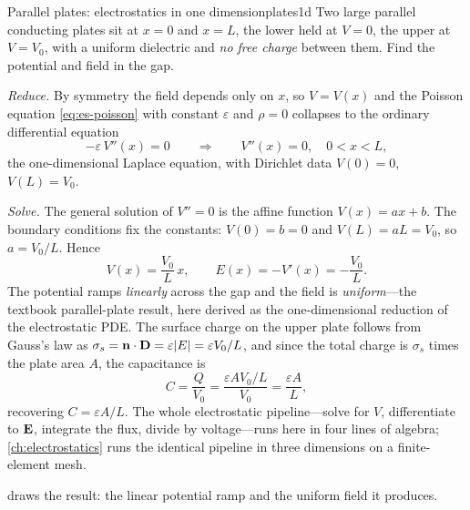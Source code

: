 \begin{workedexample}{Parallel plates: electrostatics in one dimension}{plates1d}
Two large parallel conducting plates sit at $x=0$ and $x=L$, the lower held at
$V=0$, the upper at $V=V_0$, with a uniform dielectric and \emph{no free charge}
between them. Find the potential and field in the gap.

\medskip
\emph{Reduce.} By symmetry the field depends only on $x$, so $V=V(x)$ and the
Poisson equation \cref{eq:es-poisson} with constant $\varepsilon$ and $\rho=0$
collapses to the ordinary differential equation
\begin{equation*}
  -\varepsilon\,V''(x) = 0
  \qquad\Longrightarrow\qquad
  V''(x) = 0,\quad 0<x<L,
\end{equation*}
the one-dimensional Laplace equation, with Dirichlet data $V(0)=0$, $V(L)=V_0$.

\emph{Solve.} The general solution of $V''=0$ is the affine function
$V(x)=ax+b$. The boundary conditions fix the constants: $V(0)=b=0$ and
$V(L)=aL=V_0$, so $a=V_0/L$. Hence
\begin{equation*}
  V(x) = \frac{V_0}{L}\,x,
  \qquad
  E(x) = -V'(x) = -\frac{V_0}{L}.
\end{equation*}
The potential ramps \emph{linearly} across the gap and the field is
\emph{uniform}---the textbook parallel-plate result, here derived as the
one-dimensional reduction of the electrostatic PDE. The surface charge on the
upper plate follows from Gauss's law as
$\sigma_s = \mathbf{n}\cdot\mathbf{D} = \varepsilon|E| = \varepsilon V_0/L$, and since the
total charge is $\sigma_s$ times the plate area $A$, the capacitance is
\begin{equation*}
  C = \frac{Q}{V_0} = \frac{\varepsilon A V_0/L}{V_0}
    = \frac{\varepsilon A}{L},
\end{equation*}
recovering $C=\varepsilon A/L$. The whole electrostatic pipeline---solve for $V$,
differentiate to $\mathbf{E}$, integrate the flux, divide by voltage---runs here in four
lines of algebra; \cref{ch:electrostatics} runs the identical pipeline in three
dimensions on a finite-element mesh.
\end{workedexample}

 draws the result: the linear potential ramp and the uniform
field it produces.

